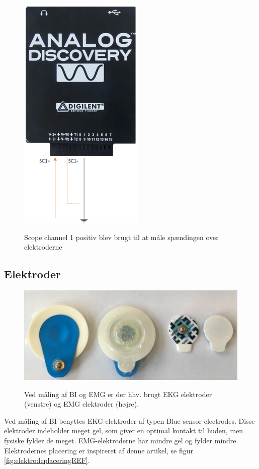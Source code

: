 \begin{figure}[H]
\centering
{\includegraphics[width=6cm]
{Figure/adkonverter}}
\caption{Scope channel 1 positiv blev brugt til at måle spændingen over elektroderne}
\label{fig:adkonverter}
\end{figure}




\subsection{Elektroder}

\begin{figure}[H]
\centering
{\includegraphics[width=12cm]
{Figure/elektroder}}
\caption{Ved måling af BI og EMG er der hhv. brugt EKG elektroder (venstre) og EMG elektroder (højre).}
\label{fig:elektroder}
\end{figure}

Ved måling af BI benyttes EKG-elektroder af typen Blue sensor electrodes. Disse elektroder indeholder meget gel, som giver en optimal kontakt til huden, men fysiske fylder de meget. EMG-elektroderne har mindre gel og fylder mindre. Elektrodernes placering er inspireret af denne artikel\cite{Nahrstaedt2012a}, se figur \ref{fig:elektrodeplaceringREF}. 

